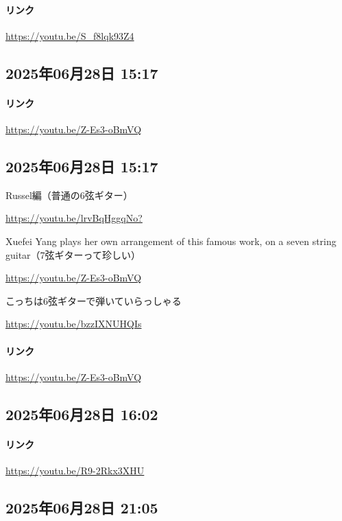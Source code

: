 \paragraph{リンク}
\url{https://youtu.be/S_f8lqk93Z4}

\subsection*{2025年06月28日 15:17}

\paragraph{リンク}
\url{https://youtu.be/Z-Es3-oBmVQ}

\subsection*{2025年06月28日 15:17}

Russel編（普通の6弦ギター）

\url{https://youtu.be/lrvBqHggqNo?}

Xuefei Yang plays her own arrangement of this famous work, on a seven string guitar（7弦ギターって珍しい）

\url{https://youtu.be/Z-Es3-oBmVQ}

こっちは6弦ギターで弾いていらっしゃる

\url{https://youtu.be/bzzIXNUHQIs}

\paragraph{リンク}
\url{https://youtu.be/Z-Es3-oBmVQ}

\subsection*{2025年06月28日 16:02}

\paragraph{リンク}
\url{https://youtu.be/R9-2Rkx3XHU}

\subsection*{2025年06月28日 21:05}

